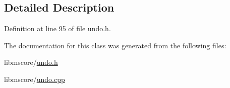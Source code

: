 \subsection{Detailed Description}


Definition at line 95 of file undo.\+h.



The documentation for this class was generated from the following files\+:\begin{DoxyCompactItemize}
\item 
libmscore/\hyperlink{undo_8h}{undo.\+h}\item 
libmscore/\hyperlink{undo_8cpp}{undo.\+cpp}\end{DoxyCompactItemize}
